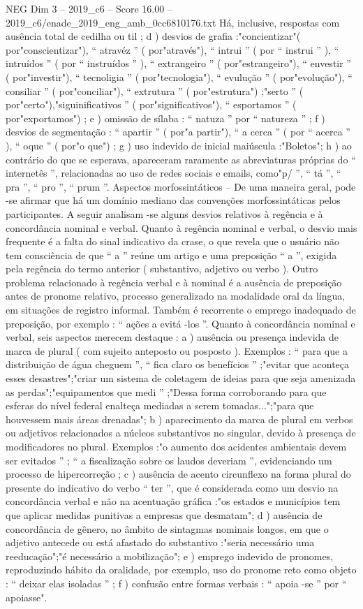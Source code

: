 \begin{textsample}{NEG Dim 3 – 2019\_c6 – Score 16.00 – 2019\_c6/enade\_2019\_eng\_amb\_0cc6810176.txt}
Há, inclusive, respostas com ausência total de cedilha ou til ; d ) desvios de grafia :"concientizar"( por"conscientizar"), “ atravéz ” ( por"através"), “ intrui ” ( por “ instrui ” ), “ intruídos ” ( por “ instruídos ” ), “ extrangeiro ” ( por"estrangeiro"), “ envestir ” ( por"investir"), “ tecnoligia ” ( por"tecnologia"), “ evulução ” ( por"evolução"), “ consiliar ” ( por"conciliar"), “ extrutura ” ( por"estrutura") ;"serto ” ( por"certo"),"siguinificativos ” ( por"significativos"), “ esportamos ” ( por"exportamos") ; e ) omissão de sílaba : “ natuza ” por “ natureza ” ; f ) desvios de segmentação : “ apartir ” ( por"a partir"), “ a cerca ” ( por “ acerca ” ), “ oque ” ( por"o que") ; g ) uso indevido de inicial maiúscula :"Boletos"; h ) ao contrário do que se esperava, apareceram raramente as abreviaturas próprias do “ internetês ”, relacionadas ao uso de redes sociais e emails, como"p/ ”, “ tá ”, “ pra ”, “ pro ”, “ prum ”.
Aspectos morfossintáticos – De uma maneira geral, pode -se afirmar que há um domínio mediano das convenções morfossintáticas pelos participantes.
A seguir analisam -se alguns desvios relativos à regência e à concordância nominal e verbal.
Quanto à regência nominal e verbal, o desvio mais frequente é a falta do sinal indicativo da crase, o que revela que o usuário não tem consciência de que “ a ” reúne um artigo e uma preposição “ a ”, exigida pela regência do termo anterior ( substantivo, adjetivo ou verbo ).
Outro problema relacionado à regência verbal e à nominal é a ausência de preposição antes de pronome relativo, processo generalizado na modalidade oral da língua, em situações de registro informal.
Também é recorrente o emprego inadequado de preposição, por exemplo : “ ações a evitá -los ”.
Quanto à concordância nominal e verbal, seis aspectos merecem destaque : a ) ausência ou presença indevida de marca de plural ( com sujeito anteposto ou posposto ).
Exemplos : “ para que a distribuição de água cheguem ”, “ fica claro os benefícios ” ;"evitar que aconteça esses desastres";"criar um sistema de coletagem de ideias para que seja amenizada as perdas";"equipamentos que medi ” ;"Dessa forma corroborando para que esferas do nível federal enalteça mediadas a serem tomadas...";"para que houvessem mais áreas drenadas"; b ) aparecimento da marca de plural em verbos ou adjetivos relacionados a núcleos substantivos no singular, devido à presença de modificadores no plural.
Exemplos :"o aumento dos acidentes ambientais devem ser evitados ” ; “ a fiscalização sobre os laudos deveriam ”, evidenciando um processo de hipercorreção ; c ) ausência de acento circunflexo na forma plural do presente do indicativo do verbo “ ter ”, que é considerada como um desvio na concordância verbal e não na acentuação gráfica :"os estados e municípios tem que aplicar medidas punitivas a empresas que desmatam"; d ) ausência de concordância de gênero, no âmbito de sintagmas nominais longos, em que o adjetivo antecede ou está afastado do substantivo :"seria necessário uma reeducação";"é necessário a mobilização"; e ) emprego indevido de pronomes, reproduzindo hábito da oralidade, por exemplo, uso do pronome reto como objeto : “ deixar elas isoladas ” ; f ) confusão entre formas verbais : “ apoia -se ” por “ apoiasse".

\end{textsample}
